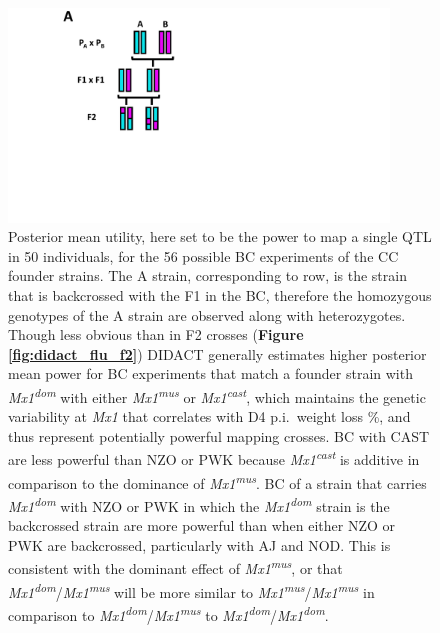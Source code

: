 \begin{figure}
\renewcommand{\familydefault}{\sfdefault}\normalfont
\centering
\includegraphics[width=0.9\textwidth, page=7, trim={3.3in 0.5in 1in 0.5in}, clip]{figures/2-didact/mapping_crosses.pdf}
\caption[Mean posterior utility for day 4 weight loss \% post Influenza A infection in BC]{Posterior mean utility, here set to be the power to map a single QTL in 50 individuals, for the 56 possible BC experiments of the CC founder strains. The A strain, corresponding to row, is the strain that is backcrossed with the F1 in the BC, therefore the homozygous genotypes of the A strain are observed along with heterozygotes. Though less obvious than in F2 crosses (\textbf{Figure \ref{fig:didact_flu_f2}}) DIDACT generally estimates higher posterior mean power for BC experiments that match a founder strain with \textit{Mx1}\textsuperscript{\textit{dom}} with either \textit{Mx1}\textsuperscript{\textit{mus}} or \textit{Mx1}\textsuperscript{\textit{cast}}, which maintains the genetic variability at \textit{Mx1} that correlates with D4 p.i.\ weight loss \%, and thus represent potentially powerful mapping crosses. BC with CAST are less powerful than NZO or PWK because \textit{Mx1}\textsuperscript{\textit{cast}} is additive in comparison to the dominance of \textit{Mx1}\textsuperscript{\textit{mus}}. BC of a strain that carries \textit{Mx1}\textsuperscript{\textit{dom}} with NZO or PWK in which the \textit{Mx1}\textsuperscript{\textit{dom}} strain is the backcrossed strain are more powerful than when either NZO or PWK are backcrossed, particularly with AJ and NOD. This is consistent with the dominant effect of \textit{Mx1}\textsuperscript{\textit{mus}}, or that \textit{Mx1}\textsuperscript{\textit{dom}}/\textit{Mx1}\textsuperscript{\textit{mus}} will be more similar to \textit{Mx1}\textsuperscript{\textit{mus}}/\textit{Mx1}\textsuperscript{\textit{mus}} in comparison to \textit{Mx1}\textsuperscript{\textit{dom}}/\textit{Mx1}\textsuperscript{\textit{mus}} to \textit{Mx1}\textsuperscript{\textit{dom}}/\textit{Mx1}\textsuperscript{\textit{dom}}.\label{fig:didact_flu_bc}}
\end{figure}

